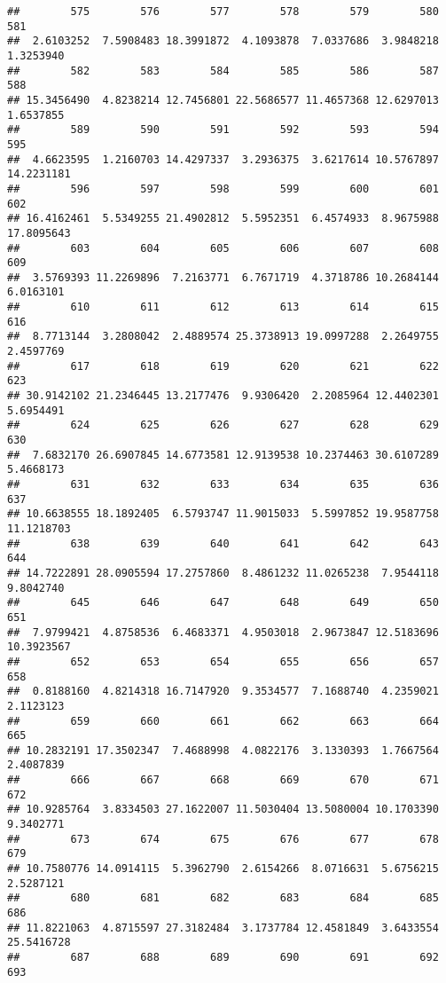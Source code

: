 \documentclass[
]{article}
\begin{document}
\begin{verbatim}
##        575        576        577        578        579        580        581 
##  2.6103252  7.5908483 18.3991872  4.1093878  7.0337686  3.9848218  1.3253940 
##        582        583        584        585        586        587        588 
## 15.3456490  4.8238214 12.7456801 22.5686577 11.4657368 12.6297013  1.6537855 
##        589        590        591        592        593        594        595 
##  4.6623595  1.2160703 14.4297337  3.2936375  3.6217614 10.5767897 14.2231181 
##        596        597        598        599        600        601        602 
## 16.4162461  5.5349255 21.4902812  5.5952351  6.4574933  8.9675988 17.8095643 
##        603        604        605        606        607        608        609 
##  3.5769393 11.2269896  7.2163771  6.7671719  4.3718786 10.2684144  6.0163101 
##        610        611        612        613        614        615        616 
##  8.7713144  3.2808042  2.4889574 25.3738913 19.0997288  2.2649755  2.4597769 
##        617        618        619        620        621        622        623 
## 30.9142102 21.2346445 13.2177476  9.9306420  2.2085964 12.4402301  5.6954491 
##        624        625        626        627        628        629        630 
##  7.6832170 26.6907845 14.6773581 12.9139538 10.2374463 30.6107289  5.4668173 
##        631        632        633        634        635        636        637 
## 10.6638555 18.1892405  6.5793747 11.9015033  5.5997852 19.9587758 11.1218703 
##        638        639        640        641        642        643        644 
## 14.7222891 28.0905594 17.2757860  8.4861232 11.0265238  7.9544118  9.8042740 
##        645        646        647        648        649        650        651 
##  7.9799421  4.8758536  6.4683371  4.9503018  2.9673847 12.5183696 10.3923567 
##        652        653        654        655        656        657        658 
##  0.8188160  4.8214318 16.7147920  9.3534577  7.1688740  4.2359021  2.1123123 
##        659        660        661        662        663        664        665 
## 10.2832191 17.3502347  7.4688998  4.0822176  3.1330393  1.7667564  2.4087839 
##        666        667        668        669        670        671        672 
## 10.9285764  3.8334503 27.1622007 11.5030404 13.5080004 10.1703390  9.3402771 
##        673        674        675        676        677        678        679 
## 10.7580776 14.0914115  5.3962790  2.6154266  8.0716631  5.6756215  2.5287121 
##        680        681        682        683        684        685        686 
## 11.8221063  4.8715597 27.3182484  3.1737784 12.4581849  3.6433554 25.5416728 
##        687        688        689        690        691        692        693 

\end{verbatim}
\end{document}
